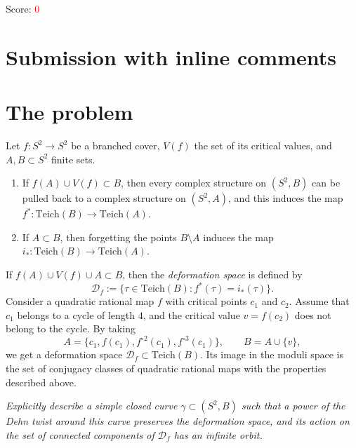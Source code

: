 \documentclass[11pt]{article}
\theoremstyle{definition}
\newcommand{\Teich}{\mathrm{Teich}}
\newcommand{\D}{\mathcal D}
\begin{document}
\noindent Score: \textcolor{red}{0}


\newpage
\section{Submission with inline comments}


\section{The problem}

Let $f\colon S^2\to S^2$ be a branched cover, $V(f)$ the set of its critical values, and $A,B\subset S^2$ finite sets.
\begin{enumerate}
\item If $f(A)\cup V(f)\subset B$, then every complex structure on $(S^2,B)$ can be pulled back to a complex structure on $(S^2,A)$, and this induces the map $f^*\colon\Teich(B)\to\Teich(A)$.
\item If $A\subset B$, then forgetting the points $B\setminus A$ induces the map $i_*\colon\Teich(B)\to\Teich(A)$.
\end{enumerate}
If $f(A)\cup V(f)\cup A\subset B$, then the \emph{deformation space} is defined by
\[\D_f:=\{\tau\in\Teich(B): f^*(\tau)=i_*(\tau)\}.\]
Consider a quadratic rational map $f$ with critical points $c_1$ and $c_2$. Assume that $c_1$ belongs to a cycle of length $4$, and the critical value $v=f(c_2)$ does not belong to the cycle. By taking
\[A=\{c_1,f(c_1),f^{\circ2}(c_1),f^{\circ3}(c_1)\},\qquad B=A\cup\{v\},\]
we get a deformation space $\D_f\subset\Teich(B)$. Its image in the moduli space is the set of conjugacy classes of quadratic rational maps with the properties described above.

\emph{Explicitly describe a simple closed curve $\gamma\subset(S^2,B)$ such that a power of the Dehn twist around this curve preserves the deformation space, and its action on the set of connected components of $\D_f$ has an infinite orbit.}
\end{document}
